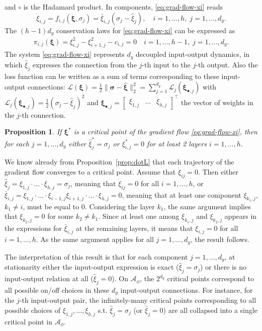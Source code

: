 \documentclass{article}
\makeatletter
\renewenvironment{proof}[1][\proofname]{
  \par\pushQED{\qed}\normalfont
  \topsep6\p@\@plus6\p@\relax
  \trivlist\item[\hskip\labelsep\bfseries#1\@addpunct{.}]
  \ignorespaces
}{
  \popQED\endtrivlist\@endpefalse
}
\newtheorem{proposition}{Proposition}
\newcommand{\1}{\mathds{1}}
\makeatother
\begin{document}
and $\circ $ is the Hadamard product. In components, \eqref{eq:grad-flow-xi} reads
\[
\dot{\xi}_{i,j} = f_{i,j}(\bm{\xi}, \sigma_j) = \bar{\xi}_{i,j}( \sigma_j -  \hat{\xi}_{j} ), \quad i=1, \ldots, h, \; j=1 , \ldots, d_y .
\]
The $ (h-1) d_y $ conservation laws for \eqref{eq:grad-flow-xi} can be expressed as
\begin{align*}
   \pi_{i,j}(\bm{\xi}) =  \xi_{i,j}^2 - \xi_{i+1,j}^2 - c_{i,j} =0  \quad i=1, \ldots, h-1, \; j=1 , \ldots, d_y .
\end{align*}
The system \eqref{eq:grad-flow-xi} represents $ d_y $ decoupled input-output dynamics, in which $ \hat{\xi}_j$ expresses the connection from the $ j$-th input to the $j$-th output. 
Also the loss function can be written as a sum of terms corresponding to these input-output connections:
$ \mathcal{L}(\bm{\xi} ) = \frac{1}{2} \| \bm{\sigma} - \hat{\bm{\xi}} \|_2^2 = \sum_{j=1}^{d_y} \mathcal{L}_j( \bm{\xi}_{\bullet,j}) $ with $\mathcal{L}_j ( \bm{\xi}_{\bullet,j}) = \frac{1}{2}(\sigma_j- \hat{\xi}_j)^2$ and $ \bm{\xi}_{\bullet,j} = \begin{bmatrix} \xi_{1,j} & \ldots & \xi_{h,j} \end{bmatrix}^\top $ the vector of weights in the $j$-th connection.


\begin{proposition}
\label{prop:diag-crit}
If $ \bm{\xi}^\ast $ is a critical point of the gradient flow \eqref{eq:grad-flow-xi}, then for each $ j=1, \ldots, d_y $ either $ \hat{\xi}_j^\ast  = \sigma_j $ or $ \xi_{i,j}^\ast =0$  for at least 2 layers $ i=1, \ldots, h$.
\end{proposition}
\begin{proof}
We know already from Proposition~\ref{prop:dotL} that each trajectory of the gradient flow converges to a critical point. 
Assume that $ \dot{\xi}_{ij}=0$. Then either $ \hat{\xi}_j =  \xi_{1,j} \cdot \ldots \cdot  \xi_{h,j} = \sigma_j $, meaning that $ \dot{\xi}_{ij}=0$ for all $i = 1 , \ldots, h$, or $ \bar{\xi}_{i,j} = \xi_{1,j} \cdot \ldots \cdot \xi_{i-1,j} \xi_{i+1,j}\cdot \ldots \cdot  \xi_{h,j} =0$, meaning that at least one component $ \xi_{k_1,j}$, $ k_1\neq i$, must be equal to 0. 
Considering the layer $ k_1$, the same argument implies that $ \xi_{k_2,j}=0$ for some $ k_2\neq k_1$. Since at least one among $ \xi_{k_1,j}$ and $ \xi_{k_2,j}$ appears in the expressions for $ \bar{\xi}_{i,j}$ at the remaining layers, it means that $ \dot{\xi}_{i,j} =0 $ for all $ i=1, \ldots, h$.
As the same argument applies for all $ j=1, \ldots, d_y$, the result follows.    
\end{proof}
The interpretation of this result is that for each component $ j=1, \ldots, d_y$, at stationarity either the input-output expression is exact ($\hat{\xi}_j = \sigma_j $) or there is no input-output relation at all ($ \hat{\xi}_j=0$).
On $ \mathcal{A}_\phi $, the $ 2^{d_y}$ critical points correspond to all possible on/off choices in these $ d_y $ input-output  connections. 
For instance, for the $ j$-th input-output pair, the infinitely-many critical points corresponding to all possible choices of $ \xi_{1,j}, \ldots, \xi_{h,j}$ s.t. $ \hat{\xi}_j=\sigma_j $ (or $ \hat{\xi}_j=0$) are all collapsed into a single critical point in $ \mathcal{A}_\phi$. 
\end{document}
